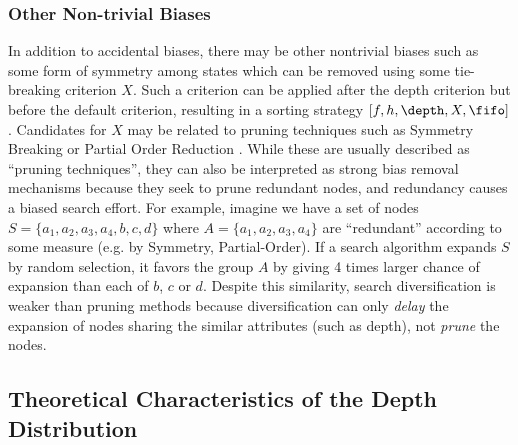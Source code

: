 \subsubsection{Other Non-trivial Biases}

In addition to accidental biases, there may be other nontrivial biases such as some form of symmetry among states which can be removed using some tie-breaking criterion $X$.
Such a criterion can be applied after the depth criterion but before the default criterion,
resulting in a sorting strategy $[f,h,\depth,X,\fifo]$. 
Candidates for $X$ may be related to pruning techniques such as Symmetry Breaking \cite{Fox1998,pochter2011exploiting,domshlak2013symmetry} or
Partial Order Reduction \cite{hall2013faster,wehrle2013relative}.
While these are usually described as ``pruning techniques'',
they can also be interpreted as strong bias removal mechanisms because
they seek to prune redundant nodes, and 
redundancy causes a biased search effort. For example, imagine we have a
set of nodes $S=\{a_1, a_2, a_3, a_4, b, c, d\}$ where
$A=\{a_1, a_2, a_3, a_4\}$ are ``redundant'' according to some measure (e.g. by Symmetry,
Partial-Order). 
If a search algorithm expands $S$ by random selection, it favors the
group $A$ by giving 4 times larger chance of expansion than each of $b$,
$c$ or $d$.
Despite this similarity, search diversification is weaker than pruning methods because diversification can only \emph{delay} the expansion of nodes sharing the similar attributes (such as depth), not \emph{prune} the nodes.


\subsection{Theoretical Characteristics of the Depth Distribution}
\label{sec:theoretical-characteristics}

